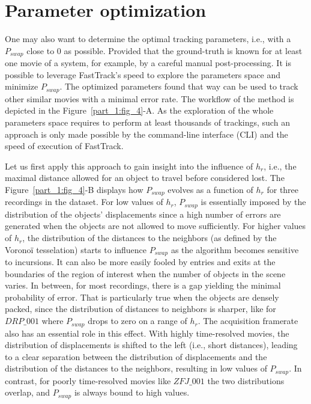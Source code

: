    \section{Parameter optimization}
    One may also want to determine the optimal tracking parameters, i.e., with a $P_{swap}$ close to 0 as possible. Provided that the ground-truth is known for at least one movie of a system, for example, by a careful manual post-processing. It is possible to leverage FastTrack's speed to explore the parameters space and minimize $P_{swap}$. The optimized parameters found that way can be used to track other similar movies with a minimal error rate. The workflow of the method is depicted in the Figure~\ref{part_1:fig_4}-A. As the exploration of the whole parameters space requires to perform at least thousands of trackings, such an approach is only made possible by the command-line interface (CLI) and the speed of execution of FastTrack.

    Let us first apply this approach to gain insight into the influence of $h_r$, i.e., the maximal distance allowed for an object to travel before considered lost. The Figure~\ref{part_1:fig_4}-B displays how $P_{swap}$ evolves as a function of $h_r$ for three recordings in the dataset. For low values of $h_r$, $P_{swap}$ is essentially imposed by the distribution of the objects' displacements since a high number of errors are generated when the objects are not allowed to move sufficiently. For higher values of $h_r$, the distribution of the distances to the neighbors (as defined by the Voronoï tesselation) starts to influence $P_{swap}$ as the algorithm becomes sensitive to incursions. It can also be more easily fooled by entries and exits at the boundaries of the region of interest when the number of objects in the scene varies.
    In between, for most recordings, there is a gap yielding the minimal probability of error. That is particularly true when the objects are densely packed, since the distribution of distances to neighbors is sharper, like for $DRP\_001$ where $P_{swap}$ drops to zero on a range of $h_r$. The acquisition framerate also has an essential role in this effect. With highly time-resolved movies, the distribution of displacements is shifted to the left (i.e., short distances), leading to a clear separation between the distribution of displacements and the distribution of the distances to the neighbors, resulting in low values of $P_{swap}$. In contrast, for poorly time-resolved movies like $ZFJ\_001$ the two distributions overlap, and $P_{swap}$ is always bound to high values.

